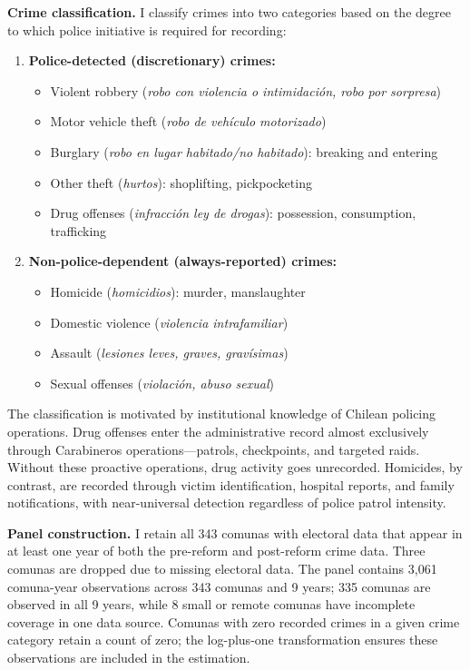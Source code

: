 \documentclass[12pt]{article}
\begin{document}
\textbf{Crime classification.} I classify crimes into two categories based on the degree to which police initiative is required for recording:

\begin{enumerate}
\item \textbf{Police-detected (discretionary) crimes:}
\begin{itemize}
\item Violent robbery (\textit{robo con violencia o intimidaci\'{o}n, robo por sorpresa})
\item Motor vehicle theft (\textit{robo de veh\'{i}culo motorizado})
\item Burglary (\textit{robo en lugar habitado/no habitado}): breaking and entering
\item Other theft (\textit{hurtos}): shoplifting, pickpocketing
\item Drug offenses (\textit{infracci\'{o}n ley de drogas}): possession, consumption, trafficking
\end{itemize}

\item \textbf{Non-police-dependent (always-reported) crimes:}
\begin{itemize}
\item Homicide (\textit{homicidios}): murder, manslaughter
\item Domestic violence (\textit{violencia intrafamiliar})
\item Assault (\textit{lesiones leves, graves, grav\'{i}simas})
\item Sexual offenses (\textit{violaci\'{o}n, abuso sexual})
\end{itemize}
\end{enumerate}

The classification is motivated by institutional knowledge of Chilean policing operations. Drug offenses enter the administrative record almost exclusively through Carabineros operations---patrols, checkpoints, and targeted raids. Without these proactive operations, drug activity goes unrecorded. Homicides, by contrast, are recorded through victim identification, hospital reports, and family notifications, with near-universal detection regardless of police patrol intensity.

\textbf{Panel construction.} I retain all 343 comunas with electoral data that appear in at least one year of both the pre-reform and post-reform crime data. Three comunas are dropped due to missing electoral data. The panel contains 3,061 comuna-year observations across 343 comunas and 9 years; 335 comunas are observed in all 9 years, while 8 small or remote comunas have incomplete coverage in one data source. Comunas with zero recorded crimes in a given crime category retain a count of zero; the log-plus-one transformation ensures these observations are included in the estimation.
\end{document}
